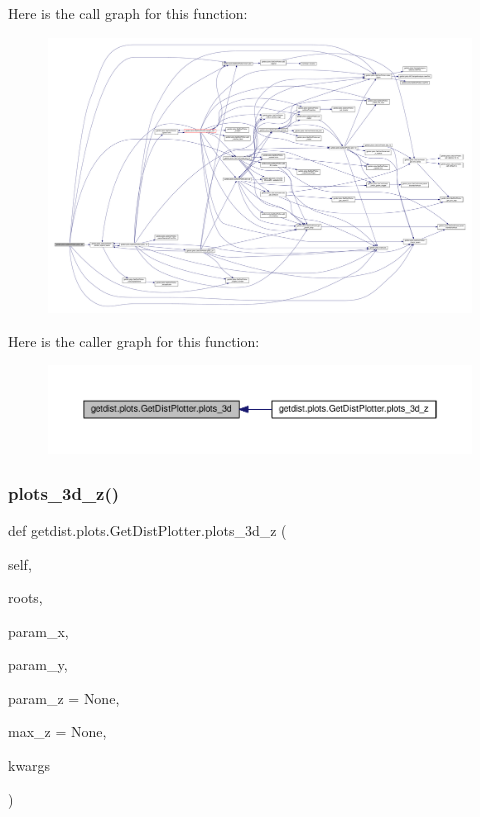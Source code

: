 Here is the call graph for this function\+:
\nopagebreak
\begin{figure}[H]
\begin{center}
\leavevmode
\includegraphics[width=350pt]{classgetdist_1_1plots_1_1GetDistPlotter_a331da209c29a04929d2e5fb97fc1e8bb_cgraph}
\end{center}
\end{figure}
Here is the caller graph for this function\+:
\nopagebreak
\begin{figure}[H]
\begin{center}
\leavevmode
\includegraphics[width=350pt]{classgetdist_1_1plots_1_1GetDistPlotter_a331da209c29a04929d2e5fb97fc1e8bb_icgraph}
\end{center}
\end{figure}
\mbox{\label{classgetdist_1_1plots_1_1GetDistPlotter_ad8246050feeaf02dc737682fc5b41292}} 
\subsubsection{\texorpdfstring{plots\+\_\+3d\+\_\+z()}{plots\_3d\_z()}}
{\footnotesize\ttfamily def getdist.\+plots.\+Get\+Dist\+Plotter.\+plots\+\_\+3d\+\_\+z (\begin{DoxyParamCaption}\item[{}]{self,  }\item[{}]{roots,  }\item[{}]{param\+\_\+x,  }\item[{}]{param\+\_\+y,  }\item[{}]{param\+\_\+z = {\ttfamily None},  }\item[{}]{max\+\_\+z = {\ttfamily None},  }\item[{}]{kwargs }\end{DoxyParamCaption})}

